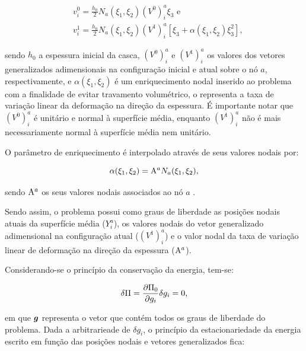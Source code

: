 \begin{subequations}
    \begin{align}
         & v_i^0=\frac{h_0}{2}N_ a(\xi_1,\xi_2)(V^0)_i^a\xi_3\text{ e}                              \\
         & v_i^1=\frac{h_0}{2}N_ a(\xi_1,\xi_2)(V^1)_i^a[\xi_3+\alpha(\xi_1,\xi_2)\xi_3^2]\text{,}
    \end{align}
\end{subequations}

\noindent sendo $h_0$ a espessura inicial da casca, $(V^0)_i^a$ e $(V^1)_i^a$ os valores dos vetores generalizados adimensionais na configuração inicial e atual sobre o nó $a$, respectivamente, e $\alpha(\xi_1,\xi_2)$ é um enriquecimento nodal inserido ao problema com a finalidade de evitar travamento volumétrico, o representa a taxa de variação linear da deformação na direção da espessura. É importante notar que $(V^0)_i^a$ é unitário e normal à superfície média, enquanto $(V^1)_i^a$ não é mais necessariamente normal à superfície média nem unitário.

O parâmetro de enriquecimento é interpolado através de seus valores nodais por:

\begin{equation}
    \alpha(\xi_1,\xi_2)=\mathrm{A}^aN_a(\xi_1,\xi_2)\text{,}
\end{equation}

\noindent sendo $\mathrm{A}^a$ os seus valores nodais associados ao nó $a$ \cite{sanches2013unconstrained,sanches2014fluid}.

Sendo assim, o problema possui como graus de liberdade as posições nodais atuais da superfície média ($Y_i^a$), os valores nodais do vetor generalizado adimensional na configuração atual ($(V^1)_i^a$) e o valor nodal da taxa de variação linear de deformação na direção da espessura ($\mathrm{A}^a$).


Considerando-se o princípio da conservação da energia, tem-se:

\begin{equation}
    \delta\Pi=\frac{\partial{\Pi_0}}{\partial{g_i}}\delta g_i=0\text{,}
\end{equation}

\noindent em que $\boldsymbol{g}$ representa o vetor que contém todos os graus de liberdade do problema. Dada a arbitrarieade de $\delta g_i$, o princípio da estacionariedade da energia escrito em função das posições nodais e vetores generalizados fica:

